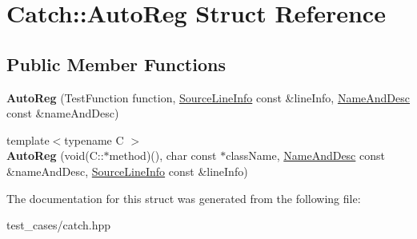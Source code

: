 \hypertarget{structCatch_1_1AutoReg}{}\section{Catch\+:\+:Auto\+Reg Struct Reference}
\label{structCatch_1_1AutoReg}
\subsection*{Public Member Functions}
\begin{DoxyCompactItemize}
\item 
\mbox{\label{structCatch_1_1AutoReg_af224f4568d57b8652474df475a164a8c}} 
{\bfseries Auto\+Reg} (Test\+Function function, \hyperlink{structCatch_1_1SourceLineInfo}{Source\+Line\+Info} const \&line\+Info, \hyperlink{structCatch_1_1NameAndDesc}{Name\+And\+Desc} const \&name\+And\+Desc)
\item 
\mbox{\label{structCatch_1_1AutoReg_a1bf9207fe0a02b46dc0ab1cc03cbe738}} 
{\footnotesize template$<$typename C $>$ }\\{\bfseries Auto\+Reg} (void(C\+::$\ast$method)(), char const $\ast$class\+Name, \hyperlink{structCatch_1_1NameAndDesc}{Name\+And\+Desc} const \&name\+And\+Desc, \hyperlink{structCatch_1_1SourceLineInfo}{Source\+Line\+Info} const \&line\+Info)
\end{DoxyCompactItemize}


The documentation for this struct was generated from the following file\+:\begin{DoxyCompactItemize}
\item 
test\+\_\+cases/catch.\+hpp\end{DoxyCompactItemize}
